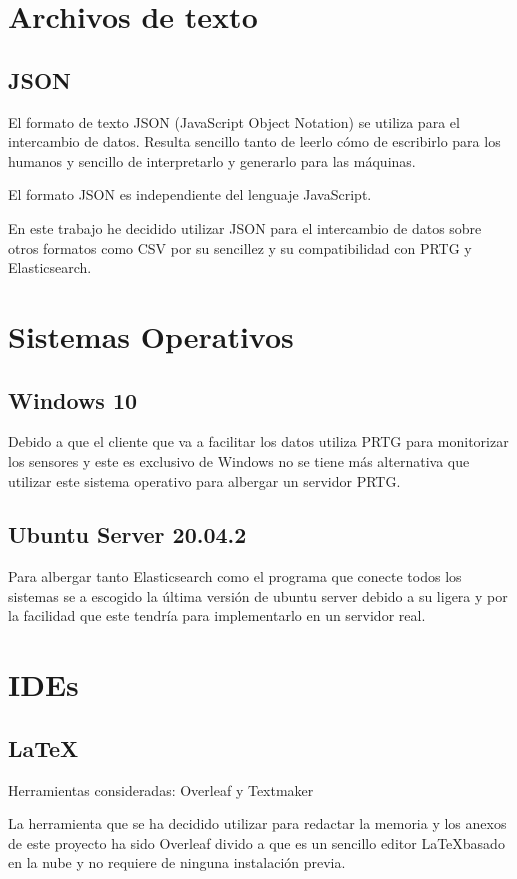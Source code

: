 \section{Archivos de texto}
\subsection{JSON}
El formato de texto JSON (JavaScript Object Notation) se utiliza para el intercambio de datos. Resulta sencillo tanto de leerlo cómo de escribirlo para los humanos y sencillo de interpretarlo y generarlo para las máquinas.

El formato JSON es independiente del lenguaje JavaScript.

En este trabajo he decidido utilizar JSON para el intercambio de datos sobre otros formatos como CSV por su sencillez y su compatibilidad con PRTG y Elasticsearch.\cite{pagina:JSON}


\section{Sistemas Operativos}

\subsection{Windows 10}
Debido a que el cliente que va a facilitar los datos utiliza PRTG para monitorizar los sensores y este es exclusivo de Windows no se tiene más alternativa que utilizar este sistema operativo para albergar un servidor PRTG.

\subsection{Ubuntu Server 20.04.2}
Para albergar tanto Elasticsearch como el programa que conecte todos los sistemas se a escogido la última versión de ubuntu server debido a su ligera y por la facilidad que este tendría para implementarlo en un servidor real.

\section{IDEs}

\subsection{\LaTeX}
Herramientas consideradas: Overleaf y Textmaker

La herramienta que se ha decidido utilizar para redactar la memoria y los anexos de este proyecto ha sido Overleaf divido a que es un sencillo editor \LaTeX basado en la nube y no requiere de ninguna instalación previa.

